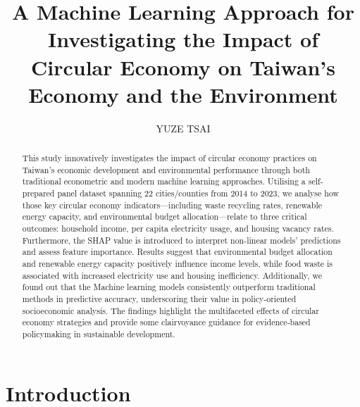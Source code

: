\documentclass{article}
\title{\textbf{A Machine Learning Approach for Investigating the Impact of Circular Economy on Taiwan's Economy and the Environment}}
\author{YUZE TSAI}
\begin{document}
\begingroup
\renewcommand{\baselinestretch}{1.5} %
\maketitle
\hypersetup{linkcolor=black}

\tableofcontents
\endgroup

\newpage

\begin{abstract}
    This study innovatively investigates the impact of circular economy practices on Taiwan’s economic development and environmental performance through both traditional econometric and modern machine learning approaches. 
    Utilising a self-prepared panel dataset spanning 22 cities/counties from 2014 to 2023, we analyse how those key circular economy indicators—including waste recycling rates, renewable energy capacity, and environmental budget allocation—relate to three critical outcomes: household income, per capita electricity usage, and housing vacancy rates. 
    Furthermore, the SHAP value is introduced to interpret non-linear models' predictions and assess feature importance. 
    Results suggest that environmental budget allocation and renewable energy capacity positively influence income levels, while food waste is associated with increased electricity use and housing inefficiency. 
    Additionally, we found out that the Machine learning models consistently outperform traditional methods in predictive accuracy, underscoring their value in policy-oriented socioeconomic analysis. 
    The findings highlight the multifaceted effects of circular economy strategies and provide some clairvoyance guidance for evidence-based policymaking in sustainable development.
\end{abstract}

\newpage
\section{Introduction}
\end{document}
